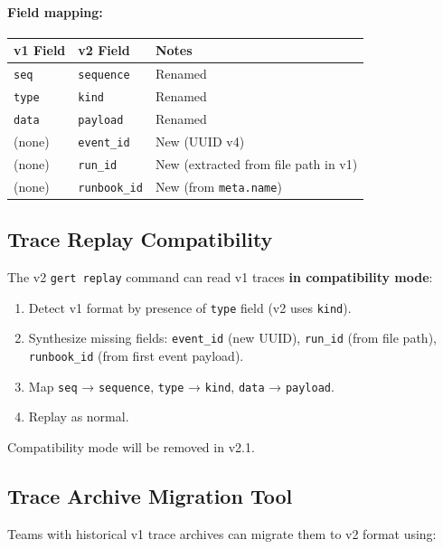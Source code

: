 \paragraph{Field mapping:}
\begin{center}
\begin{tabular}{lll}
\textbf{v1 Field} & \textbf{v2 Field} & \textbf{Notes} \\
\hline
\texttt{seq} & \texttt{sequence} & Renamed \\
\texttt{type} & \texttt{kind} & Renamed \\
\texttt{data} & \texttt{payload} & Renamed \\
(none) & \texttt{event\_id} & New (UUID v4) \\
(none) & \texttt{run\_id} & New (extracted from file path in v1) \\
(none) & \texttt{runbook\_id} & New (from \texttt{meta.name}) \\
\end{tabular}
\end{center}

\subsection{Trace Replay Compatibility}

The v2 \texttt{gert replay} command can read v1 traces \textbf{in compatibility mode}:

\begin{enumerate}
  \item Detect v1 format by presence of \texttt{type} field (v2 uses \texttt{kind}).
  \item Synthesize missing fields: \texttt{event\_id} (new UUID), \texttt{run\_id} (from file path), \texttt{runbook\_id} (from first event payload).
  \item Map \texttt{seq} → \texttt{sequence}, \texttt{type} → \texttt{kind}, \texttt{data} → \texttt{payload}.
  \item Replay as normal.
\end{enumerate}

Compatibility mode will be removed in v2.1.

\subsection{Trace Archive Migration Tool}

Teams with historical v1 trace archives can migrate them to v2 format using:

